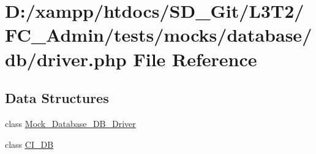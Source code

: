 \hypertarget{tests_2mocks_2database_2db_2_driver_8php}{}\section{D\+:/xampp/htdocs/\+S\+D\+\_\+\+Git/\+L3\+T2/\+F\+C\+\_\+\+Admin/tests/mocks/database/db/driver.php File Reference}
\label{tests_2mocks_2database_2db_2_driver_8php}
\subsection*{Data Structures}
\begin{DoxyCompactItemize}
\item 
class \hyperlink{class_mock___database___d_b___driver}{Mock\+\_\+\+Database\+\_\+\+D\+B\+\_\+\+Driver}
\item 
class \hyperlink{class_c_i___d_b}{C\+I\+\_\+\+D\+B}
\end{DoxyCompactItemize}
